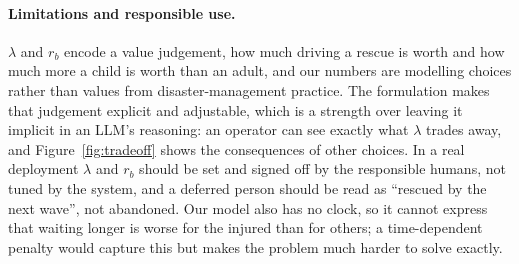 \paragraph{Limitations and responsible use.}
$\lambda$ and $r_b$ encode a value judgement, how much driving a rescue is worth and how much
more a child is worth than an adult, and our numbers are modelling choices rather than values
from disaster-management practice. The formulation makes that judgement explicit and
adjustable, which is a strength over leaving it implicit in an LLM's reasoning: an operator
can see exactly what $\lambda$ trades away, and Figure~\ref{fig:tradeoff} shows the
consequences of other choices. In a real deployment $\lambda$ and $r_b$ should be set and
signed off by the responsible humans, not tuned by the system, and a deferred person should be
read as ``rescued by the next wave'', not abandoned. Our model also has no clock, so it cannot
express that waiting longer is worse for the injured than for others; a time-dependent penalty
would capture this but makes the problem much harder to solve exactly.
